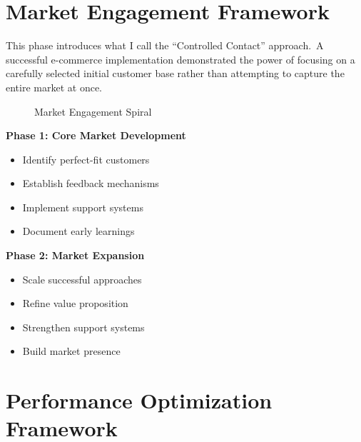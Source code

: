 \section{Market Engagement Framework}\label{sec:market-engagement}

This phase introduces what I call the ``Controlled Contact'' approach.\ A successful e-commerce implementation demonstrated the power of focusing on a carefully selected initial customer base rather than attempting to capture the entire market at once.

\begin{figure}[htbp]
    \centering
    \caption{Market Engagement Spiral}
    \label{fig:market-spiral}
\end{figure}

\begin{tcolorbox}[colback=white,colframe=primarydark,title=\textbf{Market Engagement Strategy}]
\textbf{Phase 1: Core Market Development}
\begin{itemize}
    \item Identify perfect-fit customers
    \item Establish feedback mechanisms
    \item Implement support systems
    \item Document early learnings
\end{itemize}

\textbf{Phase 2: Market Expansion}
\begin{itemize}
    \item Scale successful approaches
    \item Refine value proposition
    \item Strengthen support systems
    \item Build market presence
\end{itemize}
\end{tcolorbox}

\section{Performance Optimization Framework}\label{sec:performance-optimization}

